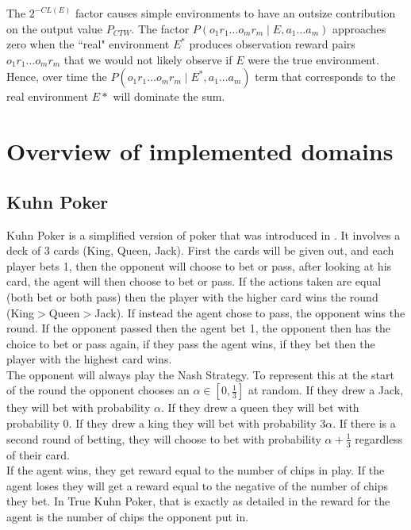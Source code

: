 \documentclass{article}
\theoremstyle{definition}
\newtheorem{primary statistics}[definition]{Primary Statistics}
\newtheorem{auxiliary statistics}[definition]{Auxiliary Statistics}
\begin{document}
The $2^{-CL(E)}$ factor causes simple environments to have an outsize contribution on the output value $P_{CTW}$. The factor $P(o_1r_1 \ldots o_mr_m \mid E, a_1 \ldots a_m)$ approaches zero when the ``real" environment $E^*$ produces observation reward pairs $o_1r_1 \ldots o_mr_m$ that we would not likely observe if $E$ were the true environment. Hence, over time the $P(o_1r_1 \ldots o_mr_m \mid E^*, a_1 \ldots a_m)$ term that corresponds to the real environment $E*$ will dominate the sum. 


\section{Overview of implemented domains}
\subsection{Kuhn Poker}
Kuhn Poker is a simplified version of poker that was introduced in \citep{kuhn1950simplified}. It involves a deck of 3 cards (King, Queen, Jack). First the cards will be given out, and each player bets 1, then the opponent will choose to bet or pass, after looking at his card, the agent will then choose to bet or pass. If the actions taken are equal (both bet or both pass) then the player with the higher card wins the round (King$>$Queen$>$Jack). If instead the agent chose to pass, the opponent wins the round. If the opponent passed then the agent bet 1, the opponent then has the choice to bet or pass again, if they pass the agent wins, if they bet then the player with the highest card wins. \\

The opponent will always play the Nash Strategy. To represent this at the start of the round the opponent chooses an $\alpha\in [0,\frac{1}{3}]$ at random. If they drew a Jack, they will bet with probability $\alpha$. If they drew a queen they will bet with probability 0. If they drew a king they will bet with probability $3\alpha$. If there is a second round of betting, they will choose to bet with probability $\alpha+\frac{1}{3}$ regardless of their card. \\

If the agent wins, they get reward equal to the number of chips in play. If the agent loses they will get a reward equal to the negative of the number of chips they bet. In True Kuhn Poker, that is exactly as detailed in \citep{kuhn1950simplified} the reward for the agent is the number of chips the opponent put in.
\end{document}
